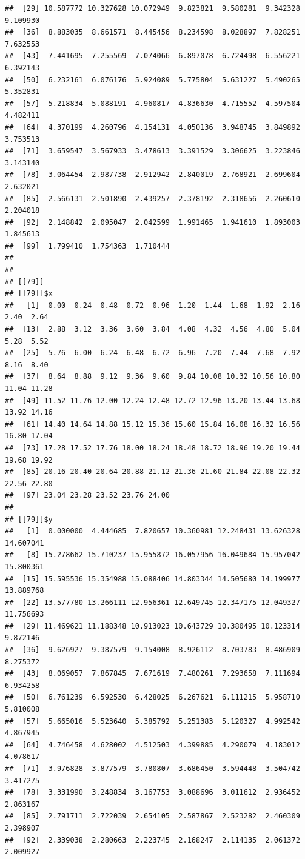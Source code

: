 \documentclass[
  ignorenonframetext,
]{beamer}
\begin{document}
\begin{frame}[fragile]{}
\begin{verbatim}
##  [29] 10.587772 10.327628 10.072949  9.823821  9.580281  9.342328  9.109930
##  [36]  8.883035  8.661571  8.445456  8.234598  8.028897  7.828251  7.632553
##  [43]  7.441695  7.255569  7.074066  6.897078  6.724498  6.556221  6.392143
##  [50]  6.232161  6.076176  5.924089  5.775804  5.631227  5.490265  5.352831
##  [57]  5.218834  5.088191  4.960817  4.836630  4.715552  4.597504  4.482411
##  [64]  4.370199  4.260796  4.154131  4.050136  3.948745  3.849892  3.753513
##  [71]  3.659547  3.567933  3.478613  3.391529  3.306625  3.223846  3.143140
##  [78]  3.064454  2.987738  2.912942  2.840019  2.768921  2.699604  2.632021
##  [85]  2.566131  2.501890  2.439257  2.378192  2.318656  2.260610  2.204018
##  [92]  2.148842  2.095047  2.042599  1.991465  1.941610  1.893003  1.845613
##  [99]  1.799410  1.754363  1.710444
## 
## 
## [[79]]
## [[79]]$x
##   [1]  0.00  0.24  0.48  0.72  0.96  1.20  1.44  1.68  1.92  2.16  2.40  2.64
##  [13]  2.88  3.12  3.36  3.60  3.84  4.08  4.32  4.56  4.80  5.04  5.28  5.52
##  [25]  5.76  6.00  6.24  6.48  6.72  6.96  7.20  7.44  7.68  7.92  8.16  8.40
##  [37]  8.64  8.88  9.12  9.36  9.60  9.84 10.08 10.32 10.56 10.80 11.04 11.28
##  [49] 11.52 11.76 12.00 12.24 12.48 12.72 12.96 13.20 13.44 13.68 13.92 14.16
##  [61] 14.40 14.64 14.88 15.12 15.36 15.60 15.84 16.08 16.32 16.56 16.80 17.04
##  [73] 17.28 17.52 17.76 18.00 18.24 18.48 18.72 18.96 19.20 19.44 19.68 19.92
##  [85] 20.16 20.40 20.64 20.88 21.12 21.36 21.60 21.84 22.08 22.32 22.56 22.80
##  [97] 23.04 23.28 23.52 23.76 24.00
## 
## [[79]]$y
##   [1]  0.000000  4.444685  7.820657 10.360981 12.248431 13.626328 14.607041
##   [8] 15.278662 15.710237 15.955872 16.057956 16.049684 15.957042 15.800361
##  [15] 15.595536 15.354988 15.088406 14.803344 14.505680 14.199977 13.889768
##  [22] 13.577780 13.266111 12.956361 12.649745 12.347175 12.049327 11.756693
##  [29] 11.469621 11.188348 10.913023 10.643729 10.380495 10.123314  9.872146
##  [36]  9.626927  9.387579  9.154008  8.926112  8.703783  8.486909  8.275372
##  [43]  8.069057  7.867845  7.671619  7.480261  7.293658  7.111694  6.934258
##  [50]  6.761239  6.592530  6.428025  6.267621  6.111215  5.958710  5.810008
##  [57]  5.665016  5.523640  5.385792  5.251383  5.120327  4.992542  4.867945
##  [64]  4.746458  4.628002  4.512503  4.399885  4.290079  4.183012  4.078617
##  [71]  3.976828  3.877579  3.780807  3.686450  3.594448  3.504742  3.417275
##  [78]  3.331990  3.248834  3.167753  3.088696  3.011612  2.936452  2.863167
##  [85]  2.791711  2.722039  2.654105  2.587867  2.523282  2.460309  2.398907
##  [92]  2.339038  2.280663  2.223745  2.168247  2.114135  2.061372  2.009927

\end{verbatim}
\end{frame}
\end{document}
